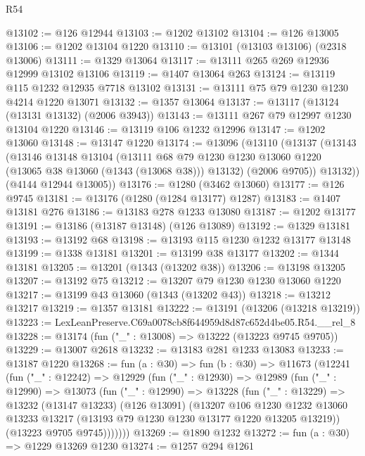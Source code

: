 \begin{lexlean}{R54}
\begin{coremodule}
@13102 := @126 @12944
@13103 := @1202 @13102
@13104 := @126 @13005
@13106 := @1202 @13104 @1220
@13110 := @13101 (@13103 @13106) (@2318 @13006)
@13111 := @1329 @13064
@13117 := @13111 @265 @269 @12936 @12999 @13102 @13106
@13119 := @1407 @13064 @263
@13124 := @13119 @115 @1232 @12935 @7718 @13102
@13131 := @13111 @75 @79 @1230 @1230 @4214 @1220 @13071
@13132 := @1357 @13064
@13137 := @13117 (@13124 (@13131 @13132) (@2006 @3943))
@13143 := @13111 @267 @79 @12997 @1230 @13104 @1220
@13146 := @13119 @106 @1232 @12996
@13147 := @1202 @13060
@13148 := @13147 @1220
@13174 := @13096
    (@13110
      (@13137
        (@13143
          (@13146
            @13148
            @13104
            (@13111
              @68
              @79
              @1230
              @1230
              @13060
              @1220
              (@13065 @38 @13060 (@1343 (@13068 @38)))
              @13132)
            (@2006 @9705))
          @13132))
      (@4144 @12944 @13005))
@13176 := @1280 (@3462 @13060)
@13177 := @126 @9745
@13181 := @13176 (@1280 (@1284 @13177) @1287)
@13183 := @1407 @13181 @276
@13186 := @13183 @278 @1233 @13080
@13187 := @1202 @13177
@13191 := @13186 (@13187 @13148) (@126 @13089)
@13192 := @1329 @13181
@13193 := @13192 @68
@13198 := @13193 @115 @1230 @1232 @13177 @13148
@13199 := @1338 @13181
@13201 := @13199 @38 @13177
@13202 := @1344 @13181
@13205 := @13201 (@1343 (@13202 @38))
@13206 := @13198 @13205
@13207 := @13192 @75
@13212 := @13207 @79 @1230 @1230 @13060 @1220
@13217 := @13199 @43 @13060 (@1343 (@13202 @43))
@13218 := @13212 @13217
@13219 := @1357 @13181
@13222 := @13191 (@13206 (@13218 @13219))
@13223 := LexLeanPreserve.C69a0078cb8f644959d8d87c652d4be05.R54.__rel_8
@13228 := @13174 (fun ("_" : @13008) => @13222 (@13223 @9745 @9705))
@13229 := @13007 @2618
@13232 := @13183 @281 @1233 @13083
@13233 := @13187 @1220
@13268 := fun (a : @30) =>
  fun (b : @30) =>
  @11673
    (@12241
      (fun ("_" : @12242) =>
      @12929
        (fun ("_" : @12930) =>
        @12989
          (fun ("_" : @12990) =>
          @13073
            (fun ("_" : @12990) =>
            @13228
              (fun ("_" : @13229) =>
              @13232
                (@13147 @13233)
                (@126 @13091)
                (@13207
                  @106
                  @1230
                  @1232
                  @13060
                  @13233
                  @13217
                  (@13193 @79 @1230 @1230 @13177 @1220 @13205 @13219))
                (@13223 @9705 @9745)))))))
@13269 := @1890 @1232
@13272 := fun (a : @30) => @1229 @13269 @1230
@13274 := @1257 @294 @1261

\end{coremodule}
\end{lexlean}
